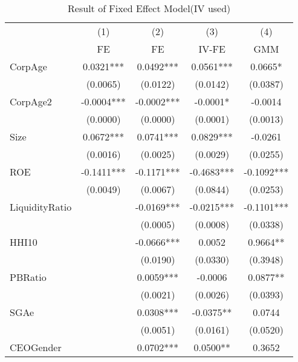 \begin{table}[htbp]\centering
\def\sym#1{\ifmmode^{#1}\else\(^{#1}\)\fi}
\caption{Result of Fixed Effect Model(IV used) \label{tab:regressionFE}}
\begin{tabular}{l*{4}{c}}
\hline\hline
            &\multicolumn{1}{c}{(1)}&\multicolumn{1}{c}{(2)}&\multicolumn{1}{c}{(3)}&\multicolumn{1}{c}{(4)}\\
            &\multicolumn{1}{c}{FE}&\multicolumn{1}{c}{FE}&\multicolumn{1}{c}{IV-FE}&\multicolumn{1}{c}{GMM}\\
\hline
CorpAge     &      0.0321***&      0.0492***&      0.0561***&      0.0665*  \\
            &    (0.0065)   &    (0.0122)   &    (0.0142)   &    (0.0387)   \\
[1em]
CorpAge2    &     -0.0004***&     -0.0002***&     -0.0001*  &     -0.0014   \\
            &    (0.0000)   &    (0.0000)   &    (0.0001)   &    (0.0013)   \\
[1em]
Size        &      0.0672***&      0.0741***&      0.0829***&     -0.0261   \\
            &    (0.0016)   &    (0.0025)   &    (0.0029)   &    (0.0255)   \\
[1em]
ROE         &     -0.1411***&     -0.1171***&     -0.4683***&     -0.1092***\\
            &    (0.0049)   &    (0.0067)   &    (0.0844)   &    (0.0253)   \\
[1em]
LiquidityRatio&               &     -0.0169***&     -0.0215***&     -0.1101***\\
            &               &    (0.0005)   &    (0.0008)   &    (0.0338)   \\
[1em]
HHI10       &               &     -0.0666***&      0.0052   &      0.9664** \\
            &               &    (0.0190)   &    (0.0330)   &    (0.3948)   \\
[1em]
PBRatio     &               &      0.0059***&     -0.0006   &      0.0877** \\
            &               &    (0.0021)   &    (0.0026)   &    (0.0393)   \\
[1em]
SGAe        &               &      0.0308***&     -0.0375** &      0.0744   \\
            &               &    (0.0051)   &    (0.0161)   &    (0.0520)   \\
[1em]
CEOGender   &               &      0.0702***&      0.0500** &      0.3652   \\

\end{tabular}
\end{table}
